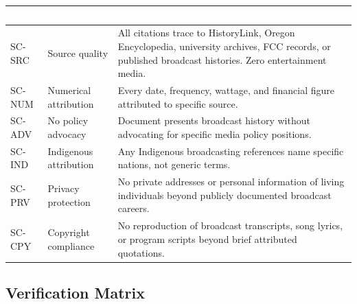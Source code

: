 \documentclass[11pt,letterpaper]{article}
\newcommand{\tableheader}[1]{\textbf{\sffamily\textcolor{white}{#1}}}
\begin{document}
\begin{center}
\begin{tabularx}{\textwidth}{L{1.5cm}L{3cm}X}
\toprule
{}
\tableheader{ID} & \tableheader{Verifies} & \tableheader{Expected Behavior} \\
\midrule
SC-SRC & Source quality & All citations trace to HistoryLink, Oregon Encyclopedia, university archives, FCC records, or published broadcast histories. Zero entertainment media. \\
SC-NUM & Numerical attribution & Every date, frequency, wattage, and financial figure attributed to specific source. \\
SC-ADV & No policy advocacy & Document presents broadcast history without advocating for specific media policy positions. \\
SC-IND & Indigenous attribution & Any Indigenous broadcasting references name specific nations, not generic terms. \\
SC-PRV & Privacy protection & No private addresses or personal information of living individuals beyond publicly documented broadcast careers. \\
SC-CPY & Copyright compliance & No reproduction of broadcast transcripts, song lyrics, or program scripts beyond brief attributed quotations. \\
\bottomrule
\end{tabularx}
\end{center}

\subsection{Verification Matrix}
\end{document}
